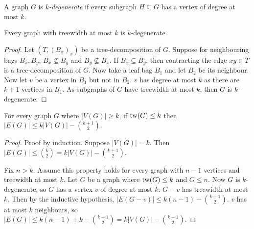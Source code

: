 A graph $G$ is \textit{$k$-degenerate} if every subgraph $H \subseteq G$ has a vertex of degree at most $k$. 

\begin{proposition}
	Every graph with treewidth at most $k$ is $k$-degenerate.
\end{proposition}
\begin{proof}
	Let \( (T, (B_x)_x) \) be a tree-decomposition of $G$. Suppose for neighbouring bags $B_x, B_y$, $B_x \nsubseteq B_y$ and $B_y \nsubseteq B_x$. If $B_x \subseteq  B_y$, then contracting the edge $xy \in T$ is a tree-decomposition of $G$. Now take a leaf bag $B_1$ and let $B_2$ be its neighbour. Now let $v$ be a vertex in $B_1$ but not in $B_2$. $v$ has degree at most $k$ as there are $k+1$ vertices in $B_1$. As subgraphs of $G$ have treewidth at most $k$, then $G$ is $k$-degenerate.
\end{proof}

\begin{proposition}\label{prop:treewidth_edge_bound}
	For every graph $G$ where $|V(G)| \geq k$, if $\operatorname{tw}(G) \leq k$ then $|E(G)|\leq k |V(G)| - \binom{k + 1}{2}$. 
\end{proposition}

\begin{proof}
	Proof by induction. Suppose $|V(G)| = k$. Then $|E(G)| \leq \binom{k}{2} = k |V(G)| - \binom{k + 1}{2}$. 

	Fix $n > k$. Assume this property holds for every graph with $n-1$ vertices and treewidth at most $k$. Let $G$ be a graph where $\operatorname{tw}(G) \leq k$ and $G \leq n$. Now $G$ is $k$-degenerate, so $G$ has a vertex $v$ of degree at most $k$. $G - v$ has treewidth at most $k$. Then by the inductive hypothesis, $|E(G - v)| \leq k (n - 1) - \binom{k + 1}{2}$. $v$ has at most $k$ neighbours, so $|E(G)| \leq k(n -1) + k - \binom{k + 1}{2} = k |V(G)| - \binom{k + 1}{2}$. 
\end{proof}
